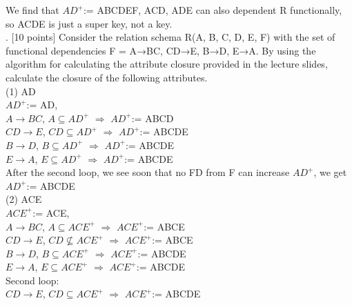 \documentclass[]{article}
\begin{document}
	We find that $AD^{+}$:= ABCDEF, ACD, ADE can also dependent R functionally, so ACDE is just a super key, not a key.  \\
	
	. [10 points] Consider the relation schema R(A, B, C, D, E, F) with the set of functional dependencies F = {A→BC, CD→E, B→D, E→A}. By using the algorithm for calculating the attribute closure provided in the lecture slides, calculate the closure of the following attributes.   \\
	
	(1) AD  \\
	
	$AD^{+}$:= AD,   \\
	
	$A\rightarrow BC$, $A\subseteq AD^{+}$ $\Longrightarrow$ $AD^{+}$:= ABCD \\
	
	$CD\rightarrow E$, $CD\subseteq AD^{+}$ $\Longrightarrow$ $AD^{+}$:= ABCDE \\
	
	$B\rightarrow D$, $B\subseteq AD^{+}$  $\Longrightarrow$ $AD^{+}$:= ABCDE \\
	
	$E\rightarrow A$, $E\subseteq AD^{+}$  $\Longrightarrow$ $AD^{+}$:= ABCDE \\
	
	After the second loop, we see soon that no FD from F can increase $AD^{+}$, we get $AD^{+}$:= ABCDE   \\
	
	(2) ACE   \\
	
	$ACE^{+}$:= ACE,   \\
	
	$A\rightarrow BC$, $A\subseteq ACE^{+}$ $\Longrightarrow$ $ACE^{+}$:= ABCE \\
	
	$CD\rightarrow E$, $CD\not\subseteq ACE^{+}$ $\Longrightarrow$ $ACE^{+}$:= ABCE \\
	
	$B\rightarrow D$, $B\subseteq ACE^{+}$  $\Longrightarrow$ $ACE^{+}$:= ABCDE \\
	
	$E\rightarrow A$, $E\subseteq ACE^{+}$  $\Longrightarrow$ $ACE^{+}$:= ABCDE \\
	
	Second loop: \\
	
	$CD\rightarrow E$, $CD\subseteq ACE^{+}$ $\Longrightarrow$ $ACE^{+}$:= ABCDE \\
	
\end{document}
